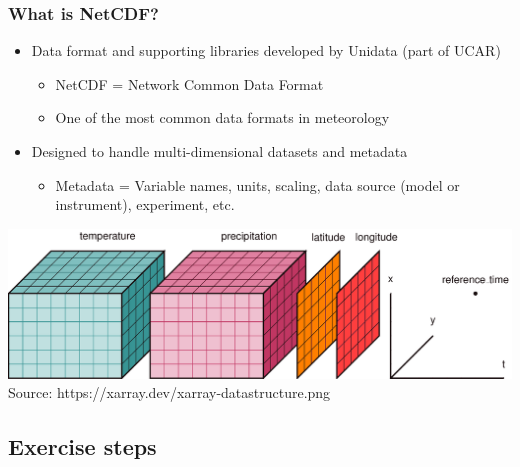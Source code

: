 \documentclass[hyperref,pdfa,unicode,utf8,usepdftitle]{beamer}
\begin{document}
\begin{frame}
  \frametitle{What is NetCDF?}
  \begin{itemize}
  \item Data format and supporting libraries developed by Unidata
    (part of UCAR)
    \begin{itemize}
    \item NetCDF = Network Common Data Format
    \item One of the most common data formats in meteorology
    \end{itemize}
  \item Designed to handle multi-dimensional datasets and metadata
    \begin{itemize}
    \item Metadata = Variable names, units, scaling, data source
      (model or instrument), experiment, etc.
    \end{itemize}
  \end{itemize}
  \includegraphics[width=\textwidth]{xarray-datastructure}
  \tiny Source: https://xarray.dev/xarray-datastructure.png
\end{frame}

\subsection{Exercise steps}
\end{document}
